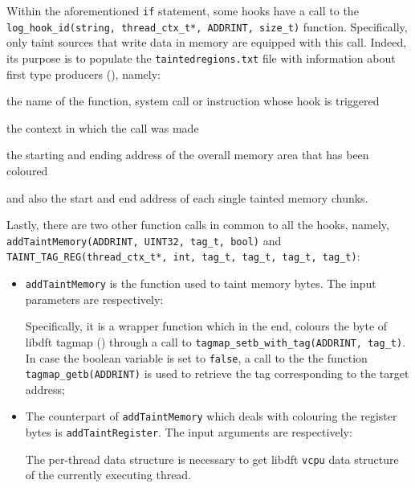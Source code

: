 \documentclass[LaM,binding=0.6cm]{sapthesis}
\begin{document}
Within the aforementioned \texttt{if} statement, some hooks have a call to the \texttt{log\_hoo\-k\_id(string, thread\_ctx\_t*, ADDRINT, size\_t)} function. Specifically, only taint sources that write data in memory are equipped with this call. Indeed, its purpose is to populate the \texttt{taintedregions.txt} file with information about first type producers (), namely:
\begin{enumerate*}[label=\roman*),itemjoin={,\quad}]
\item the name of the function, system call or instruction whose hook is triggered
\item the context in which the call was made
\item the starting and ending address of the overall memory area that has been coloured
\item and also the start and end address of each single tainted memory chunks.
\end{enumerate*}
Lastly, there are two other function calls in common to all the hooks, namely, \texttt{addTaintMemory(ADDRINT, UINT32, tag\_t, bool)} and \texttt{TAINT\_TAG\_REG(thread\_ctx\_t*, int, tag\_t, tag\_t, tag\_t, tag\_t)}:
\begin{itemize}
\item \texttt{addTaintMemory} is the function used to taint memory bytes. The input parameters are respectively: 
Specifically, it is a wrapper function which in the end, colours the byte of libdft tagmap () through a call to \texttt{tagmap\_setb\_with\_tag(ADDRINT, tag\_t)}. In case the boolean variable is set to \texttt{false}, a call to the the function \texttt{tagmap\_getb(ADDRINT)} is used to retrieve the tag corresponding to the target address;
\item The counterpart of \texttt{addTaintMemory} which deals with colouring the register bytes is \texttt{addTaintRegister}. The input arguments are respectively:
The per-thread data structure is necessary to get libdft \texttt{vcpu} data structure of the currently executing thread.
\end{itemize}
\end{document}
